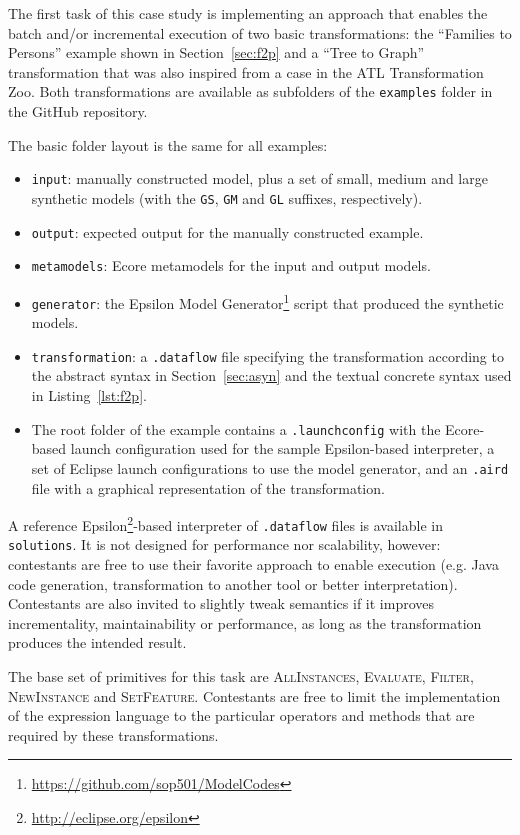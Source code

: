 \documentclass[a4paper]{scrartcl}
\newcommand*{\class}[1]{\textsc{#1}}
\newcommand*{\file}[1]{\texttt{#1}}
\begin{document}
The first task of this case study is implementing an approach that
enables the batch and/or incremental execution of two basic
transformations: the ``Families to Persons'' example shown in
Section~\ref{sec:f2p} and a ``Tree to Graph'' transformation that was
also inspired from a case in the ATL Transformation Zoo. Both
transformations are available as subfolders of the \file{examples}
folder in the GitHub repository.

The basic folder layout is the same for all examples:
\begin{itemize}
\item \file{input}: manually constructed model, plus a set of small,
  medium and large synthetic models (with the \file{GS}, \file{GM} and
  \file{GL} suffixes, respectively).
\item \file{output}: expected output for the manually constructed
  example.
\item \file{metamodels}: Ecore metamodels for the input and output
  models.
\item \file{generator}: the Epsilon Model
  Generator\footnote{\url{https://github.com/sop501/ModelCodes}}
  script that produced the synthetic models.
\item \file{transformation}: a \file{.dataflow} file specifying the
  transformation according to the abstract syntax in
  Section~\ref{sec:asyn} and the textual concrete syntax used in
  Listing~\ref{lst:f2p}.
\item The root folder of the example contains a \file{.launchconfig}
  with the Ecore-based launch configuration used for the sample
  Epsilon-based interpreter, a set of Eclipse launch configurations to
  use the model generator, and an \file{.aird} file with a graphical
  representation of the transformation.
\end{itemize}

A reference Epsilon\footnote{\url{http://eclipse.org/epsilon}}-based
interpreter of \file{.dataflow} files is available in
\file{solutions}. It is not designed for performance nor scalability,
however: contestants are free to use their favorite approach to enable
execution (e.g. Java code generation, transformation to another tool
or better interpretation). Contestants are also invited to slightly
tweak semantics if it improves incrementality, maintainability or
performance, as long as the transformation produces the intended
result.

The base set of primitives for this task are \class{AllInstances},
\class{Evaluate}, \class{Filter}, \class{NewInstance} and
\class{SetFeature}. Contestants are free to limit the implementation
of the expression language to the particular operators and methods
that are required by these transformations.
\end{document}
